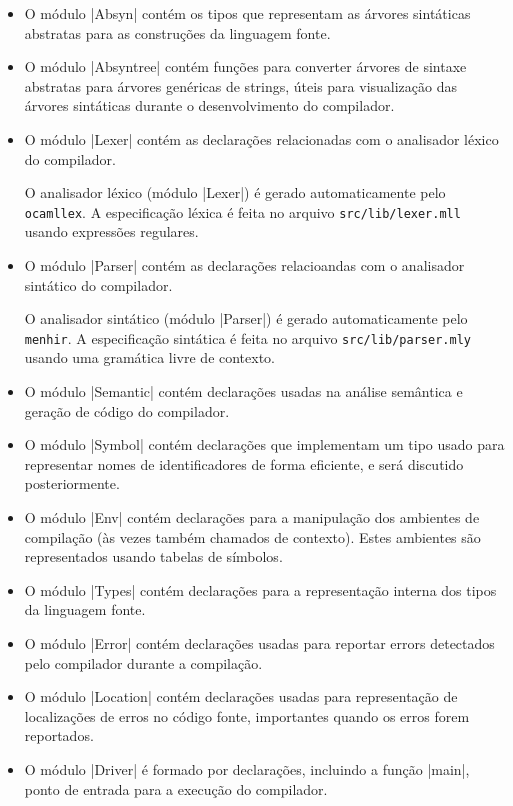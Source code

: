 \documentclass[a4paper,11pt,brazil]{article}
\begin{document}
\begin{itemize}
  \item O módulo \pyginline|Absyn| contém os tipos que representam as
  árvores sintáticas abstratas para as construções da linguagem fonte.

  \item O módulo \pyginline|Absyntree| contém funções para converter
  árvores de sintaxe abstratas para árvores genéricas de strings,
  úteis para visualização das árvores sintáticas durante o
  desenvolvimento do compilador.

  \item O módulo \pyginline|Lexer| contém as declarações relacionadas
  com o analisador léxico do compilador.

  O analisador léxico (módulo \pyginline|Lexer|) é gerado
  automaticamente pelo \texttt{ocamllex}. A especificação léxica é
  feita no arquivo \texttt{src/lib/lexer.mll} usando expressões
  regulares.

  \item O módulo \pyginline|Parser| contém as declarações relacioandas
  com o analisador sintático do compilador.

  O analisador sintático (módulo \pyginline|Parser|) é gerado
  automaticamente pelo \texttt{menhir}. A especificação sintática é
  feita no arquivo \texttt{src/lib/parser.mly} usando uma gramática
  livre de contexto.
  
  \item O módulo \pyginline|Semantic| contém declarações usadas na
  análise semântica e geração de código do compilador.

  \item O módulo \pyginline|Symbol| contém declarações que implementam
  um tipo usado para representar nomes de identificadores de forma
  eficiente, e será discutido posteriormente.

  \item O módulo \pyginline|Env| contém declarações para a manipulação
  dos ambientes de compilação (às vezes também chamados de
  contexto). Estes ambientes são representados usando tabelas de
  símbolos.

  \item O módulo \pyginline|Types| contém declarações para a
  representação interna dos tipos da linguagem fonte.

  \item O módulo \pyginline|Error| contém declarações usadas para
  reportar errors detectados pelo compilador durante a compilação.

  \item O módulo \pyginline|Location| contém declarações usadas para
  representação de localizações de erros no código fonte, importantes
  quando os erros forem reportados.

  \item O módulo \pyginline|Driver| é formado por declarações,
  incluindo a função \pyginline|main|, ponto de entrada para a
  execução do compilador.
\end{itemize}
\end{document}
